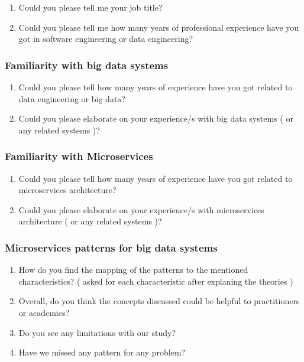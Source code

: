 \documentclass{bmcart}
\begin{document}
\begin{backmatter}
\begin{enumerate}
    \item Could you please tell me your job title? 
    \item Could you please tell me how many years of professional experience have you got in software engineering or data engineering? 
\end{enumerate}

\subsubsection{\textbf{Familiarity with big data systems}}

\begin{enumerate}
    \item Could you please tell how many years of experience have you got related to data engineering or big data?
    \item Could you please elaborate on your experience/s with big data systems ( or any related systems )? 
\end{enumerate}


\subsubsection{\textbf{Familiarity with Microservices}}

\begin{enumerate}
    \item Could you please tell how many years of experience have you got related to microservices architecture?
    \item Could you please elaborate on your experience/s with microservices architecture ( or any related systems )?
\end{enumerate}


\subsubsection{\textbf{Microservices patterns for big data systems}}

\begin{enumerate}
    \item How do you find the mapping of the patterns to the mentioned characteristics? ( asked for each characteristic after explaning the theories )
    \item Overall, do you think the concepts discussed could be helpful to practitioners or academics?  
    \item Do you see any limitations with our study? 
    \item Have we missed any pattern for any problem?
\end{enumerate}


\end{backmatter}
\end{document}
